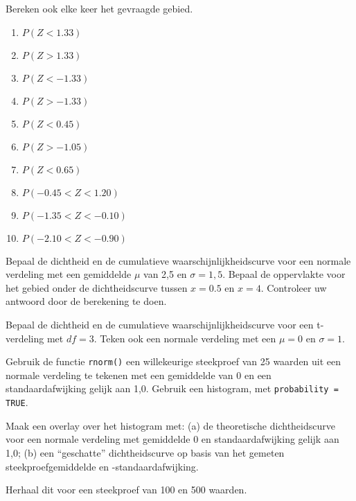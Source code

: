 \begin{exercise}
  \label{ex:prob-norm-dist}
  Bereken ook elke keer het gevraagde gebied.
  \begin{enumerate}[label=\alph*.]
    \item $P(Z < 1.33)$
    \item $P(Z > 1.33)$
    \item $P(Z < -1.33)$
    \item $P(Z > -1.33)$
    \item $P(Z < 0.45)$
    \item $P(Z > -1.05)$
    \item $P(Z < 0.65)$
    \item $P(-0.45 < Z < 1.20)$
    \item $P(-1.35 < Z < -0.10)$
    \item $P(-2.10 < Z < -0.90)$
  \end{enumerate}
\end{exercise}

\begin{exercise}
	Bepaal de dichtheid en de cumulatieve waarschijnlijkheidscurve voor een normale verdeling met een gemiddelde $\mu$
	van 2,5 en $\sigma = 1,5$. Bepaal de oppervlakte voor het gebied onder de dichtheidscurve tussen
	$x = 0.5$ en $x = 4$. Controleer uw antwoord door de berekening te doen.
\end{exercise}

\begin{exercise}
	Bepaal de dichtheid en de cumulatieve waarschijnlijkheidscurve voor een t-verdeling met $df = 3$. Teken ook een normale verdeling met een $\mu = 0$  en $\sigma = 1$.
\end{exercise}

\begin{exercise}
Gebruik de functie \verb|rnorm()| een willekeurige steekproef van 25 waarden uit een normale verdeling te tekenen met een gemiddelde van 0 en een standaardafwijking gelijk aan 1,0. Gebruik een histogram, met \verb|probability = TRUE|.

Maak een overlay over het histogram met: (a) de theoretische dichtheidscurve voor een normale verdeling met gemiddelde 0 en standaardafwijking gelijk aan 1,0; (b) een ``geschatte'' dichtheidscurve op basis van het gemeten steekproefgemiddelde en -standaardafwijking.

Herhaal dit voor een steekproef van 100 en 500 waarden.
\end{exercise}

